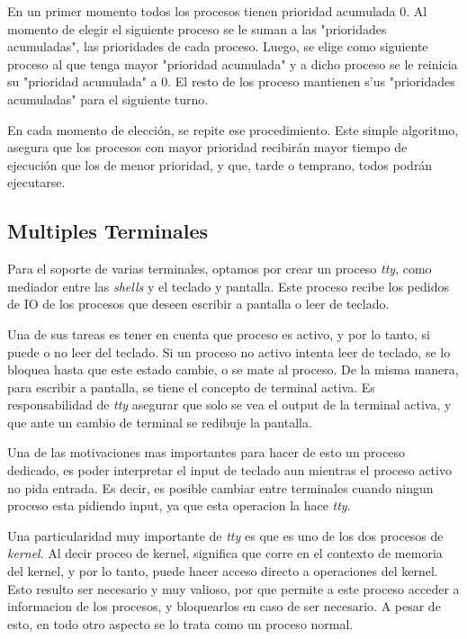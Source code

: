 \documentclass[a4paper,10pt]{article}
\begin{document}
        En un primer momento todos los procesos tienen prioridad acumulada 0. Al momento de elegir el siguiente proceso
        se le suman a las "prioridades acumuladas", las prioridades de cada proceso. Luego, se elige como siguiente 
        proceso al que tenga mayor "prioridad acumulada" y a dicho proceso se le reinicia su "prioridad acumulada" a 0.
        El resto de los proceso mantienen s'us "prioridades acumuladas" para el siguiente turno. 

        En cada momento de elección, se repite ese procedimiento. Este simple algoritmo, asegura que los procesos con 
        mayor prioridad recibirán mayor tiempo de ejecución que los de menor prioridad, y que, tarde o temprano, todos
        podrán ejecutarse.

\subsection{Multiples Terminales}
Para el soporte de varias terminales, optamos por crear un proceso \textit{tty}, como mediador entre las \textit{shells} y el teclado y pantalla.
Este proceso recibe los pedidos de IO de los procesos que deseen escribir a pantalla o leer de teclado.

Una de sus tareas es tener en cuenta que proceso es activo, y por lo tanto, si puede o no leer del teclado.
Si un proceso no activo intenta leer de teclado, se lo bloquea hasta que este estado cambie, o se mate al proceso.
De la misma manera, para escribir a pantalla, se tiene el concepto de terminal activa.
Es responsabilidad de \textit{tty} asegurar que solo se vea el output de la terminal activa, y que ante un cambio de terminal se redibuje la pantalla.

Una de las motivaciones mas importantes para hacer de esto un proceso dedicado, es poder interpretar el input de teclado aun mientras el proceso activo no pida entrada.
Es decir, es posible cambiar entre terminales cuando ningun proceso esta pidiendo input, ya que esta operacion la hace \textit{tty}.

Una particularidad muy importante de \textit{tty} es que es uno de los dos procesos de \textit{kernel}.
Al decir proceo de kernel, significa que corre en el contexto de memoria del kernel, y por lo tanto, puede hacer acceso directo a operaciones del kernel.
Esto resulto ser necesario y muy valioso, por que permite a este proceso acceder a informacion de los procesos, y bloquearlos en caso de ser necesario.
A pesar de esto, en todo otro aspecto se lo trata como un proceso normal.
\end{document}
